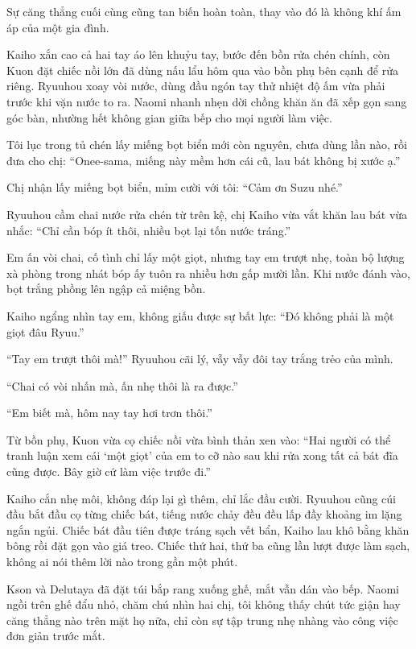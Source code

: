 \documentclass[../main.tex]{subfiles}
\begin{document}
Sự căng thẳng cuối cùng cũng tan biến hoàn toàn, thay vào đó là không khí ấm áp của một gia đình.

\ct

Kaiho xắn cao cả hai tay áo lên khuỷu tay, bước đến bồn rửa chén chính, còn Kuon đặt chiếc nồi lớn đã dùng nấu lẩu hôm qua vào bồn phụ bên cạnh để rửa riêng. Ryuuhou xoay vòi nước, dùng đầu ngón tay thử nhiệt độ ấm vừa phải trước khi vặn nước to ra. Naomi nhanh nhẹn dời chồng khăn ăn đã xếp gọn sang góc bàn, nhường hết không gian giữa bếp cho mọi người làm việc.

Tôi lục trong tủ chén lấy miếng bọt biển mới còn nguyên, chưa dùng lần nào, rồi đưa cho chị: ``Onee-sama, miếng này mềm hơn cái cũ, lau bát không bị xước ạ.''

Chị nhận lấy miếng bọt biển, mỉm cười với tôi: ``Cảm ơn Suzu nhé.''

Ryuuhou cầm chai nước rửa chén từ trên kệ, chị Kaiho vừa vắt khăn lau bát vừa nhắc: ``Chỉ cần bóp ít thôi, nhiều bọt lại tốn nước tráng.''

Em ấn vòi chai, cố tình chỉ lấy một giọt, nhưng tay em trượt nhẹ, toàn bộ lượng xà phòng trong nhát bóp ấy tuôn ra nhiều hơn gấp mười lần. Khi nước đánh vào, bọt trắng phồng lên ngập cả miệng bồn.

Kaiho ngẩng nhìn tay em, không giấu được sự bất lực: ``Đó không phải là một giọt đâu Ryuu.''

``Tay em trượt thôi mà!'' Ryuuhou cãi lý, vẫy vẫy đôi tay trắng trẻo của mình.

``Chai có vòi nhấn mà, ấn nhẹ thôi là ra được.''

``Em biết mà, hôm nay tay hơi trơn thôi.''

Từ bồn phụ, Kuon vừa cọ chiếc nồi vừa bình thản xen vào: ``Hai người có thể tranh luận xem cái `một giọt' của em to cỡ nào sau khi rửa xong tất cả bát đĩa cũng được. Bây giờ cứ làm việc trước đi.''

Kaiho cắn nhẹ môi, không đáp lại gì thêm, chỉ lắc đầu cười. Ryuuhou cũng cúi đầu bắt đầu cọ từng chiếc bát, tiếng nước chảy đều đều lấp đầy khoảng im lặng ngắn ngủi. Chiếc bát đầu tiên được tráng sạch vết bẩn, Kaiho lau khô bằng khăn bông rồi đặt gọn vào giá treo. Chiếc thứ hai, thứ ba cũng lần lượt được làm sạch, không ai nói thêm lời nào trong gần một phút.

Kson và Delutaya đã đặt túi bắp rang xuống ghế, mắt vẫn dán vào bếp. Naomi ngồi trên ghế đẩu nhỏ, chăm chú nhìn hai chị, tôi không thấy chút tức giận hay căng thẳng nào trên mặt họ nữa, chỉ còn sự tập trung nhẹ nhàng vào công việc đơn giản trước mắt.
\end{document}
